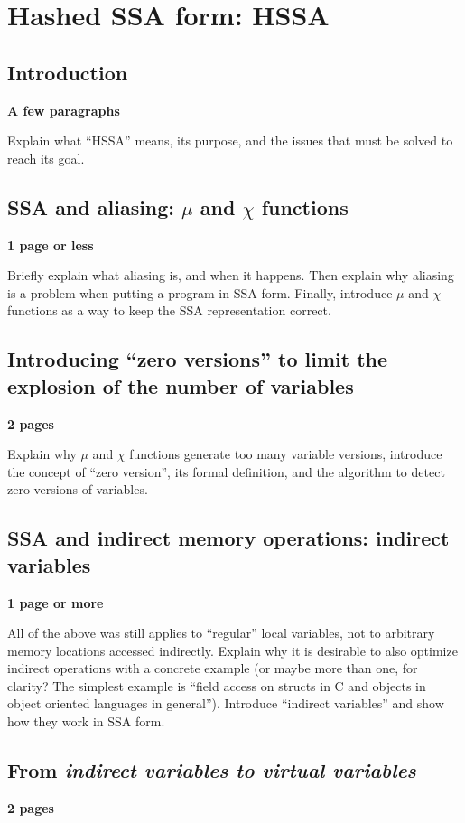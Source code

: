 \applynumberofpages\chapter{Hashed SSA form: HSSA }


\section{Introduction}
\textbf{A few paragraphs}

Explain what ``HSSA'' means, its purpose, and the issues that must be solved to reach its goal.

\section{SSA and aliasing: $\mu$ and $\chi$ functions}
\textbf{1 page or less}

Briefly explain what aliasing is, and when it happens.
Then explain why aliasing is a problem when putting a program in SSA form.
Finally, introduce $\mu$ and $\chi$ functions as a way to keep the SSA representation correct.

\section{Introducing ``zero versions'' to limit the explosion of the number of variables}
\textbf{2 pages}

Explain why $\mu$ and $\chi$ functions generate too many variable versions, introduce the concept of ``zero version'', its formal definition, and the algorithm to detect zero versions of variables.

\section{SSA and indirect memory operations: indirect variables}
\textbf{1 page or more}

All of the above was still applies to ``regular'' local variables, not to arbitrary memory locations accessed indirectly.
Explain why it is desirable to also optimize indirect operations with a concrete example (or maybe more than one, for clarity? The simplest example is ``field access on structs in C and objects in object oriented languages in general'').
Introduce ``indirect variables'' and show how they work in SSA form.

\section{From \em{indirect} variables to \em{virtual} variables}
\textbf{2 pages}

